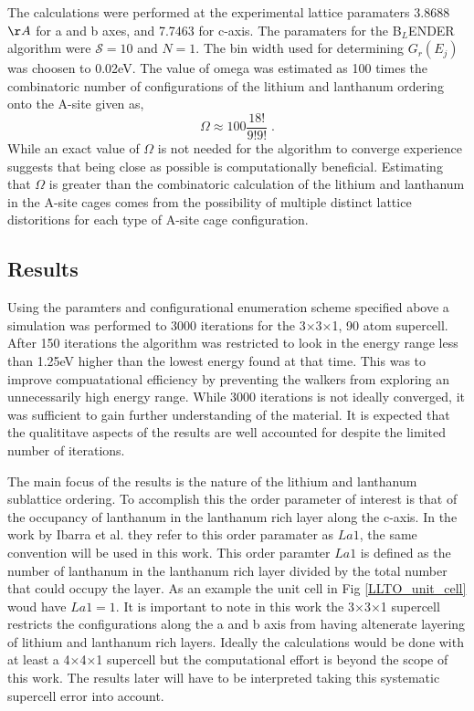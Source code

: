 \documentclass[aps,prl,reprint,superscriptaddress,showkeys]{revtex4-1}
\begin{document}
  The calculations were performed at the experimental lattice paramaters 3.8688$\AA$ for a and b axes, and 7.7463 for c-axis. The paramaters for the B$_L$ENDER algorithm were $\mathcal{S}=10$ and $N=1$. The bin width used for determining $G_r(E_j)$ was choosen to 0.02eV. The value of omega was estimated as 100 times the combinatoric number of configurations of the lithium and lanthanum ordering onto the A-site  given as, 
\begin{equation}
\Omega \approx 100\frac{18!}{9!9!} \;.
\end{equation}
While an exact value of $\Omega$ is not needed for the algorithm to converge experience suggests that being close as possible is computationally beneficial. Estimating that $\Omega$ is greater than the combinatoric calculation of the lithium and lanthanum in the A-site cages comes from the possibility of multiple distinct lattice distoritions for each type of A-site cage configuration. 
\subsection{Results}
  Using the paramters and configurational enumeration scheme specified above a simulation was performed to 3000 iterations for  the 3$\times$3$\times$1,  90 atom supercell. After 150 iterations the algorithm was restricted to look  in the energy range less than 1.25eV higher than the lowest energy found at that time. This was to improve compuatational efficiency by preventing the walkers from exploring an unnecessarily high energy range. While 3000 iterations is not ideally converged, it was sufficient to gain further understanding of the material. It is expected that the qualititave aspects of the results are well accounted for despite the limited number of iterations. 
  
The main focus of the results is the nature of the lithium and lanthanum sublattice ordering. To accomplish this the order parameter of interest is that of the occupancy of lanthanum in the lanthanum rich layer along the c-axis.  In the work by Ibarra et al. \cite{P4mmmstrucuture} they refer to this order paramater as $La1$, the same convention will be used in this work. This order paramter $La1$ is defined as the number of lanthanum in the lanthanum rich layer divided by the total number that could occupy the layer. As an example the unit cell in Fig \ref{LLTO_unit_cell} woud have $La1=1$. It is important to note in this work the 3$\times$3$\times$1 supercell restricts the configurations along the a and b axis from having altenerate layering of lithium and lanthanum rich layers. Ideally the calculations would be done with at least a 4$\times$4$\times$1 supercell but the computational effort is beyond the scope of this work. The results later will have to be interpreted taking this systematic supercell error into account.  
  
\end{document}
